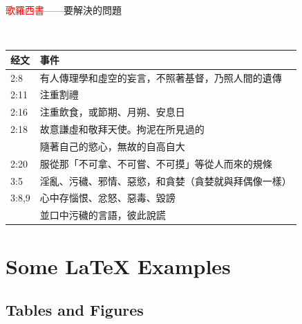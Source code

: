 \documentclass{beamer}
\begin{document}
\begin{frame}{\textcolor{red}{歌羅西書}——要解決的問題}
\begin{block}{}\\
\begin{table}
\hspace{-0.7cm}
\begin{tabular}{l|l}
经文& 事件\\\hline\hline
2:8&有人傳理學和虛空的妄言，不照著基督，乃照人間的遺傳\\\hline
2:11&注重割禮\\\hline
2:16&注重飲食，或節期、月朔、安息日  \\\hline
2:18&故意謙虛和敬拜天使。拘泥在所見過的\\\hline
&隨著自己的慾心，無故的自高自大 \\\hline
2:20&服從那「不可拿、不可嘗、不可摸」等從人而來的規條\\\hline
3:5&淫亂、污穢、邪情、惡慾，和貪婪（貪婪就與拜偶像一樣）\\\hline
3:8,9&心中存惱恨、忿怒、惡毒、毀謗\\\hline
&並口中污穢的言語，彼此說謊\\\hline\hline
\end{tabular}
\end{table}
\end{block}
\end{frame}








\iffalse


\section{Some \LaTeX{} Examples}

\subsection{Tables and Figures}
\end{document}
